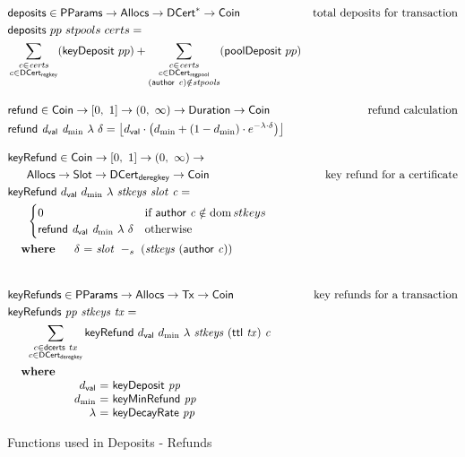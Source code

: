 \documentclass[11pt,a4paper,dvipsnames]{article}
\newcommand{\Tx}{\type{Tx}}
\newcommand{\Coin}{\type{Coin}}
\newcommand{\PParams}{\type{PParams}}
\newcommand{\Slot}{\type{Slot}}
\newcommand{\Duration}{\type{Duration}}
\newcommand{\Allocs}{\type{Allocs}}
\newcommand{\DCert}{\type{DCert}}
\newcommand{\DCertRegKey}{\type{DCert_{regkey}}}
\newcommand{\DCertDeRegKey}{\type{DCert_{deregkey}}}
\newcommand{\DCertRegPool}{\type{DCert_{regpool}}}
\newcommand{\ttl}[1]{\fun{ttl}~ \var{#1}}
\newcommand{\keyRefund}[6]{\fun{keyRefund}~ {#1}~{#2}~{#3}~\var{#4}~\var{#5}~\var{#6}}
\newcommand{\refund}[4]{\fun{refund}~ \var{#1}~ \var{#2}~ {#3}~ {#4}}
\newcommand{\keyRefunds}[3]{\fun{keyRefunds}~ \var{#1}~ \var{#2}~ \var{#3}}
\newcommand{\cauthor}[1]{\fun{author}~ \var{#1}}
\newcommand{\slotminus}[2]{\var{#1}~-_{s}~\var{#2}}
\DeclarePairedDelimiter\floor{\lfloor}{\rfloor}
\newcommand{\dval}{\ensuremath{d_{\mathsf{val}}}}
\newcommand{\unitInterval}{\ensuremath{[0,~1]}}
\newcommand{\posReals}{\ensuremath{(0,~\infty)}}
\theoremstyle{definition}
\theoremstyle{definition}
\begin{document}
\begin{figure}
  \begin{align*}
    & \fun{deposits} \in \PParams \to \Allocs \to \seqof{\DCert} \to \Coin
    & \text{total deposits for transaction} \\
    & \fun{deposits}~{pp}~{stpools}~{certs} = \\
    &  \sum\limits_{\substack{c\in\var{certs} \\ c\in\DCertRegKey}}(\fun{keyDeposit}~pp)
    +  \sum\limits_{\substack{c\in\var{certs} \\ c\in\DCertRegPool \\ (\cauthor{c})\notin \var{stpools}}}
            (\fun{poolDeposit}~pp)
      \nextdef
      & \fun{refund} \in \Coin \to \unitInterval \to \posReals \to \Duration \to \Coin
      & \text{refund calculation} \\
      & \refund{\dval}{d_{\min}}{\lambda}{\delta} =
            \floor*{
              \dval \cdot
            \left(d_{\min}+(1-d_{\min})\cdot e^{-\lambda\cdot\delta}\right)}
      \nextdef
      & \fun{keyRefund} \in \Coin \to \unitInterval \to \posReals \to \\
      & ~~~~~\Allocs \to \Slot \to \DCertDeRegKey \to \Coin
      & \text{key refund for a certificate} \\
      & \keyRefund{\dval}{d_{\min}}{\lambda}{stkeys}{slot}{c} =\\
      & ~~~~~\begin{cases}
            0 & \text{if}~\cauthor c \notin \dom stkeys\\
            \refund{\dval}{d_{\min}}{\lambda}{\delta}
            & \text{otherwise}
        \end{cases}\\
      &
      \begin{array}{lr@{~=~}l}
        \where
        &\delta & \slotminus{slot}{(stkeys~(\cauthor c))}\\
      \end{array}\\
      \nextdef
      & \fun{keyRefunds} \in \PParams \to \Allocs \to \Tx \to \Coin
      & \text{key refunds for a transaction} \\
      & \keyRefunds{pp}{stkeys}{tx} =\\
      & ~~~~~ \sum\limits_{\substack{c \in \fun{dcerts}~tx \\ c\in\DCertDeRegKey}}
              \keyRefund{\dval}{d_{\min}}{\lambda}{stkeys}{(\ttl{tx})}{c}\\
      &
      \begin{array}{lr@{~=~}l}
        \where \\
        & \dval & \fun{keyDeposit}~\var{pp}\\
        & d_{\min} & \fun{keyMinRefund}~\var{pp}\\
        & \lambda & \fun{keyDecayRate}~\var{pp}\\
      \end{array}\\
  \end{align*}
  \caption{Functions used in Deposits - Refunds}
  \label{fig:functions:deposits-refunds}
\end{figure}
\end{document}

